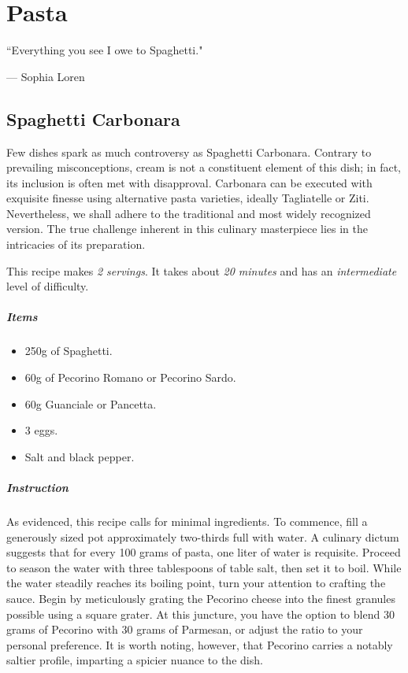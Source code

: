 \chapter{Pasta}
\label{pasta}
\epigraph{``Everything you see I owe to Spaghetti."}{--- \textup{Sophia Loren}}

\section{Spaghetti Carbonara}
\label{Spaghetticarbonara}
Few dishes spark as much controversy as Spaghetti Carbonara. Contrary to prevailing misconceptions, cream is not a constituent element of this dish; in fact, its inclusion is often met with disapproval. Carbonara can be executed with exquisite finesse using alternative pasta varieties, ideally Tagliatelle or Ziti. Nevertheless, we shall adhere to the traditional and most widely recognized version. The true challenge inherent in this culinary masterpiece lies in the intricacies of its preparation.

This recipe makes \emph{2 servings}. It takes about \emph{20 minutes} and has an \emph{intermediate} level of difficulty. 

\paragraph{Items}
\begin{itemize}[noitemsep]
    \item[\ding{182}] 250g of Spaghetti.
    \item[\ding{183}] 60g of Pecorino Romano or Pecorino Sardo.
    \item[\ding{184}] 60g Guanciale or Pancetta.
    \item[\ding{185}] 3 eggs.
    \item[\ding{186}] Salt and black pepper.
\end{itemize}

\paragraph{Instruction} 
As evidenced, this recipe calls for minimal ingredients. To commence, fill a generously sized pot approximately two-thirds full with water. A culinary dictum suggests that for every 100 grams of pasta, one liter of water is requisite. Proceed to season the water with three tablespoons of table salt, then set it to boil. While the water steadily reaches its boiling point, turn your attention to crafting the sauce. Begin by meticulously grating the Pecorino cheese into the finest granules possible using a square grater. At this juncture, you have the option to blend 30 grams of Pecorino with 30 grams of Parmesan, or adjust the ratio to your personal preference. It is worth noting, however, that Pecorino carries a notably saltier profile, imparting a spicier nuance to the dish.

